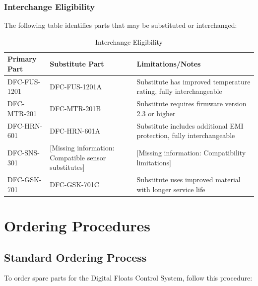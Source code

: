 \documentclass[12pt,a4paper,twoside,openright]{book}
\newcommand{\tabletextfont}{\normalfont\rmfamily}
\newcommand{\tableheadfont}{\normalfont\bfseries}
\begin{document}
\subsubsection{Interchange Eligibility}

The following table identifies parts that may be substituted or interchanged:

\begin{table}[h]
\centering
\setlength{\tabcolsep}{5pt} %
\begin{tabular}{|p{}|p{}|p{}|}
\hline
\tableheadfont\textbf{Primary Part} & \tableheadfont\textbf{Substitute Part} & \tableheadfont\textbf{Limitations/Notes} \\
\hline
\tabletextfont DFC-FUS-1201 & DFC-FUS-1201A & Substitute has improved temperature rating, fully interchangeable \\
\hline
\tabletextfont DFC-MTR-201 & DFC-MTR-201B & Substitute requires firmware version 2.3 or higher \\
\hline
\tabletextfont DFC-HRN-601 & DFC-HRN-601A & Substitute includes additional EMI protection, fully interchangeable \\
\hline
\tabletextfont DFC-SNS-301 & {\color{missingred}[Missing information: Compatible sensor substitutes]} & {\color{missingred}[Missing information: Compatibility limitations]} \\
\hline
\tabletextfont DFC-GSK-701 & DFC-GSK-701C & Substitute uses improved material with longer service life \\
\hline
\end{tabular}
\caption{Interchange Eligibility}
\end{table}

\section{Ordering Procedures}

\subsection{Standard Ordering Process}

To order spare parts for the Digital Floats Control System, follow this procedure:
\end{document}
